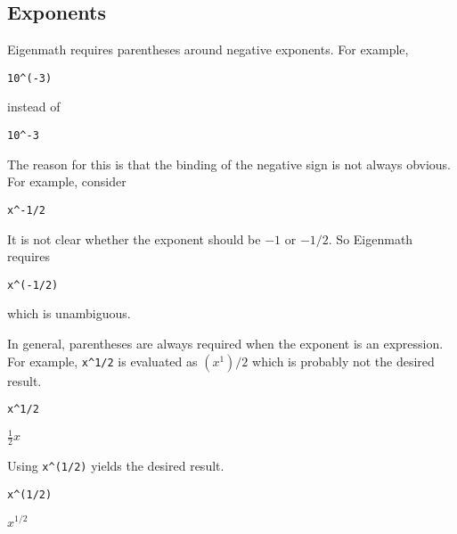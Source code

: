 \subsection{Exponents}

Eigenmath requires parentheses around negative exponents.
For example,

\begin{Verbatim}[formatcom=\color{blue}]
10^(-3)
\end{Verbatim}

\noindent
instead of

\begin{Verbatim}[formatcom=\color{blue}]
10^-3
\end{Verbatim}

\noindent
The reason for this is that the binding of the negative sign is not always
obvious.
For example, consider

\begin{Verbatim}[formatcom=\color{blue}]
x^-1/2
\end{Verbatim}

\noindent
It is not clear whether the exponent should be $-1$ or $-1/2$.
So Eigenmath requires

\begin{Verbatim}[formatcom=\color{blue}]
x^(-1/2)
\end{Verbatim}

\noindent
which is unambiguous.

\bigskip
\noindent
In general, parentheses are always required when the exponent
is an expression.
For example, \verb$x^1/2$ is evaluated as $(x^1)/2$ which
is probably not the desired result.

\begin{Verbatim}[formatcom=\color{blue}]
x^1/2
\end{Verbatim}

\noindent
$\displaystyle \tfrac{1}{2}x$

\bigskip
\noindent
Using \verb$x^(1/2)$ yields the desired result.

\begin{Verbatim}[formatcom=\color{blue}]
x^(1/2)
\end{Verbatim}

\noindent
$\displaystyle x^{1/2}$
